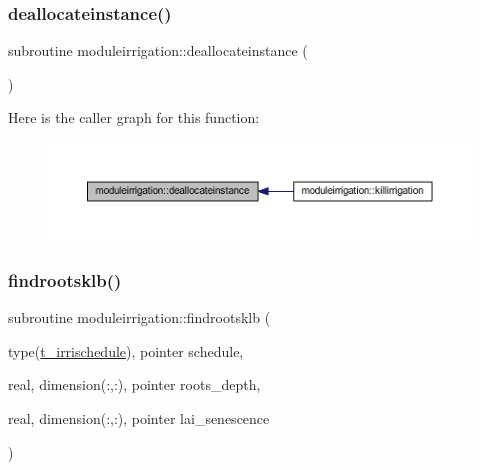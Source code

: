\subsubsection{\texorpdfstring{deallocateinstance()}{deallocateinstance()}}
{\footnotesize\ttfamily subroutine moduleirrigation\+::deallocateinstance (\begin{DoxyParamCaption}{ }\end{DoxyParamCaption})\hspace{0.3cm}{\ttfamily [private]}}

Here is the caller graph for this function\+:\nopagebreak
\begin{figure}[H]
\begin{center}
\leavevmode
\includegraphics[width=350pt]{namespacemoduleirrigation_a01348df0fa0c9f40c6462d69d05b875b_icgraph}
\end{center}
\end{figure}
\mbox{\label{namespacemoduleirrigation_a3bf1e9298115d3f00376f1288687113b}} 
\subsubsection{\texorpdfstring{findrootsklb()}{findrootsklb()}}
{\footnotesize\ttfamily subroutine moduleirrigation\+::findrootsklb (\begin{DoxyParamCaption}\item[{type(\mbox{\hyperlink{structmoduleirrigation_1_1t__irrischedule}{t\+\_\+irrischedule}}), pointer}]{schedule,  }\item[{real, dimension(\+:,\+:), pointer}]{roots\+\_\+depth,  }\item[{real, dimension(\+:,\+:), pointer}]{lai\+\_\+senescence }\end{DoxyParamCaption})\hspace{0.3cm}{\ttfamily [private]}}

